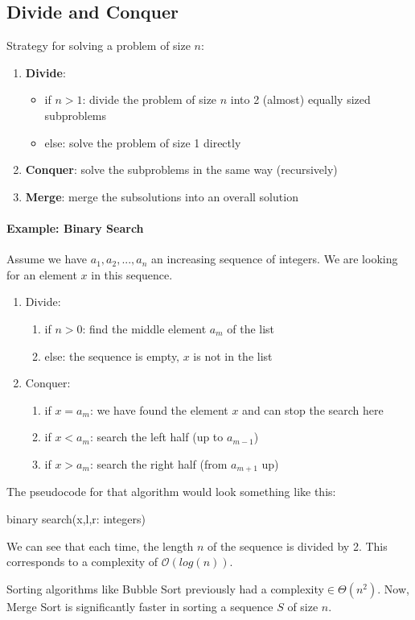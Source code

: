 \documentclass[10pt,a4paper]{book}
\begin{document}
\subsection{Divide and Conquer}
Strategy for solving a problem of size $n$:
\begin{enumerate}
\item \textbf{Divide}:
\begin{itemize}
\item if $n>1$: divide the problem of size $n$ into 2 (almost) equally sized subproblems
\item else: solve the problem of size 1 directly
\end{itemize}
\item \textbf{Conquer}: solve the subproblems in the same way (recursively)
\item \textbf{Merge}: merge the subsolutions into an overall solution
\end{enumerate}
\paragraph*{Example: Binary Search}
Assume we have $a_1,a_2,...,a_n$ an increasing sequence of integers. We are looking for an element $x$ in this sequence.
\begin{enumerate}
\item Divide:
\begin{enumerate}
\item if $n>0$: find the middle element $a_m$ of the list
\item else: the sequence is empty, $x$ is not in the list
\end{enumerate}
\item Conquer:
\begin{enumerate}
\item if $x=a_m$: we have found the element $x$ and can stop the search here
\item if $x<a_m$: search the left half (up to $a_{m-1}$)
\item if $x>a_m$: search the right half (from $a_{m+1}$ up)
\end{enumerate}
\end{enumerate}
The pseudocode for that algorithm would look something like this:
\begin{procedure}
\caption{binary search(x,l,r: integers)}
\DontPrintSemicolon
\SetAlgoNoEnd
{}
\end{procedure}
We can see that each time, the length $n$ of the sequence is divided by 2. This corresponds to a complexity of $\mathcal{O}(log(n))$.\par 
Sorting algorithms like Bubble Sort previously had a complexity$\in \Theta(n^2)$. Now, Merge Sort is significantly faster in sorting a sequence $S$ of size $n$.
\end{document}
